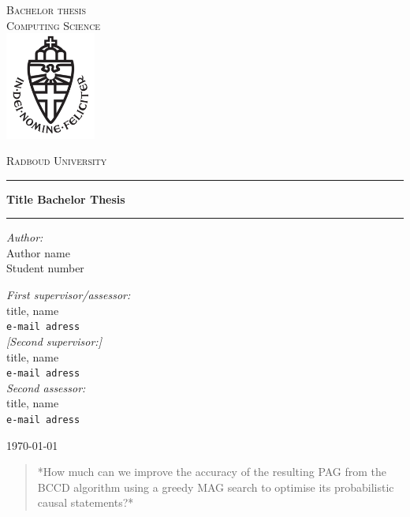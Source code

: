 \documentclass[11pt,a4paper]{report}
\begin{document}
\begin{titlepage}
\begin{center}
\textsc{\LARGE Bachelor thesis\\Computing Science}\\[1.5cm]
\includegraphics[height=100pt]{logo}

\vspace{0.4cm}
\textsc{\Large Radboud University}\\[1cm]
\hrule
\vspace{0.4cm}
\textbf{\huge Title Bachelor Thesis}\\[0.4cm]
\hrule
\vspace{2cm}
\begin{minipage}[t]{0.45\textwidth}
\begin{flushleft} \large
\textit{Author:}\\
Author name\\
Student number
\end{flushleft}
\end{minipage}
\begin{minipage}[t]{0.45\textwidth}
\begin{flushright} \large
\textit{First supervisor/assessor:}\\
title, name\\
\texttt{e-mail adress}\\[1.3cm]
\textit{[Second supervisor:]}\\
title, name\\
\texttt{e-mail adress}\\[1.3cm]
\textit{Second assessor:}\\
title, name\\
\texttt{e-mail adress}
\end{flushright}
\end{minipage}
\vfill
{\large \today}
\end{center}
\end{titlepage}

\begin{abstract}
*How much can we improve the accuracy of the resulting PAG from the BCCD
algorithm using a greedy MAG search to optimise its probabilistic causal
statements?*
\end{abstract}
\end{document}
